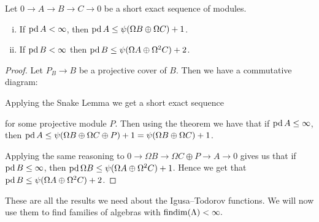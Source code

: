 \begin{cor}\label{cor:projdim_bounded_by_psi}
	Let $0 \to A \to B \to C \to 0$ be a short exact sequence of modules. 
	\begin{enumerate}[i)]
		\item \label{cor:projdim_bounded_by_psi_i}
		If $\operatorname{pd} A < \infty$, then $\operatorname{pd} A \leq \psi(\Omega B \oplus \Omega C)+1$.
		\item \label{cor:projdim_bounded_by_psi_ii}
		If $\operatorname{pd} B < \infty$ then $\operatorname{pd} B \leq \psi(\Omega A \oplus \Omega^2 C) + 2$.
	\end{enumerate}
	\begin{proof}
		Let $P_B \to B$ be a projective cover of $B$. Then we have a commutative diagram:
		\begin{center}
		\end{center}
		Applying the Snake Lemma we get a short exact sequence
		\begin{center}
		\end{center} 
		for some projective module $P$. Then using the theorem we have that if $\operatorname{pd} A \leq \infty$, then $\operatorname{pd} A \leq \psi(\Omega B \oplus \Omega C \oplus P) + 1 = \psi(\Omega B \oplus \Omega C) + 1$.
		
		Applying the same reasoning to $0 \to \Omega B \to \Omega C \oplus P \to A \to 0$ gives us that if $\operatorname{pd} B \leq \infty$, then $\operatorname{pd}\Omega B \leq \psi(\Omega A \oplus \Omega^2 C) + 1$. Hence we get that $\operatorname{pd} B \leq  \psi(\Omega A \oplus \Omega^2 C) + 2$.
	\end{proof}
\end{cor}

These are all the results we need about the Igusa--Todorov functions. We will now use them to find families of algebras with $\operatorname{findim}(\Lambda) < \infty.$


